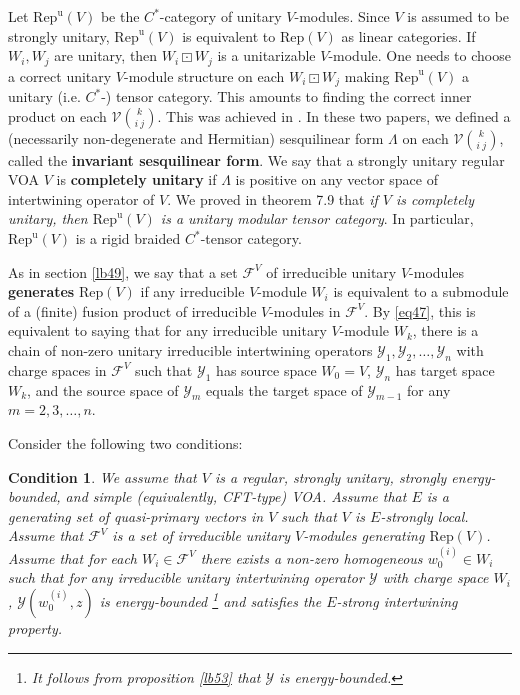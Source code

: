 \documentclass[11pt,b5paper,notitlepage]{article}
\theoremstyle{definition}
\theoremstyle{plain}
\newtheorem{cond}{Condition}
\newcommand{\mc}{\mathcal}
\newcommand{\RepV}{\mathrm{Rep}(V)}
\newcommand{\RepuV}{\mathrm{Rep}^{\mathrm u}(V)}
\numberwithin{equation}{subsection}
\begin{document}
Let $\RepuV$ be the $C^*$-category of unitary $V$-modules. Since $V$ is assumed to be strongly unitary, $\RepuV$ is equivalent to $\RepV$ as linear categories. If $W_i,W_j$ are unitary, then $W_i\boxdot W_j$ is a unitarizable $V$-module. One needs to choose a correct unitary $V$-module structure on each $W_i\boxdot W_j$  making $\RepuV$ a unitary (i.e. $C^*$-) tensor category. This amounts to finding the correct inner product on each $\mc V{k\choose i~j}$. This was achieved in \cite{Gui19a,Gui19b}. In these two papers, we defined a (necessarily non-degenerate and Hermitian) sesquilinear form $\Lambda$ on each $\mc V{k\choose i~j}$, called the \textbf{invariant sesquilinear form}. We say that a strongly unitary regular VOA $V$ is \textbf{completely unitary} if $\Lambda$ is positive on any vector space of intertwining operator of $V$. We proved in \cite{Gui19b} theorem 7.9 that \emph{if $V$ is completely unitary, then $\RepuV$ is a unitary modular tensor category}. In particular, $\RepuV$ is a rigid braided $C^*$-tensor category. 

As in section \ref{lb49}, we say that a set $\mc F^V$ of irreducible unitary $V$-modules  \textbf{generates} $\RepV$ if any irreducible $V$-module $W_i$ is equivalent to a submodule of a (finite) fusion product of irreducible $V$-modules in $\mc F^V$. By \eqref{eq47}, this is equivalent to saying that for any irreducible unitary $V$-module $W_k$, there is a chain of non-zero unitary irreducible intertwining operators $\mc Y_1,\mc Y_2,\dots,\mc Y_n$ with charge spaces in $\mc F^V$ such that $\mc Y_1$ has source space $W_0=V$, $\mc Y_n$ has target space $W_k$, and the source space of $\mc Y_m$ equals the target space of $\mc Y_{m-1}$ for any $m=2,3,\dots,n$.

Consider the following two conditions:

\begin{cond}\label{cd1}
We assume that $V$ is a regular, strongly unitary, strongly energy-bounded, and simple (equivalently, CFT-type) VOA. Assume that $E$ is a generating set of quasi-primary vectors in $V$ such that $V$ is $E$-strongly local. Assume that $\mc F^V$ is a set of irreducible unitary $V$-modules generating $\RepV$. Assume that for each $W_i\in \mc F^V$ there exists a non-zero homogeneous $w^{(i)}_0\in W_i$ such that for any irreducible unitary intertwining operator $\mc Y$ with charge space $W_i$, $\mc Y(w^{(i)}_0,z)$ is energy-bounded \footnote{It follows from proposition \ref{lb53} that $\mc Y$ is energy-bounded.} and satisfies the $E$-strong intertwining property.
\end{cond}
\end{document}
